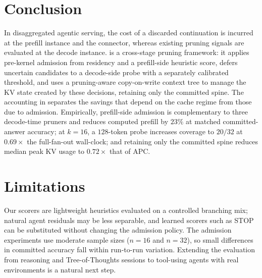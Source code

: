 \section{Conclusion}
\label{sec:conclusion}

In disaggregated agentic serving, the cost of a discarded continuation is incurred at the prefill instance and the connector, whereas existing pruning signals are evaluated at the decode instance.
\sys is a cross-stage pruning framework: it applies pre-kernel admission from residency and a prefill-side heuristic score, defers uncertain candidates to a decode-side probe with a separately calibrated threshold, and uses a pruning-aware copy-on-write context tree to manage the KV state created by these decisions, retaining only the committed spine.
The accounting in  separates the savings that depend on the cache regime from those due to admission.
Empirically, prefill-side admission is complementary to three decode-time pruners and reduces computed prefill by $23\%$ at matched committed-answer accuracy; at $k{=}16$, a $128$-token probe increases coverage to $20/32$ at $0.69\times$ the full-fan-out wall-clock; and retaining only the committed spine reduces median peak KV usage to $0.72\times$ that of APC.

\section*{Limitations}
\label{sec:limitations}

Our scorers are lightweight heuristics evaluated on a controlled branching mix; natural agent residuals may be less separable, and learned scorers such as STOP~\cite{stoploss} can be substituted without changing the admission policy.
The admission experiments use moderate sample sizes ($n{=}16$ and $n{=}32$), so small differences in committed accuracy fall within run-to-run variation.
Extending the evaluation from reasoning and Tree-of-Thoughts sessions to tool-using agents with real environments is a natural next step.
